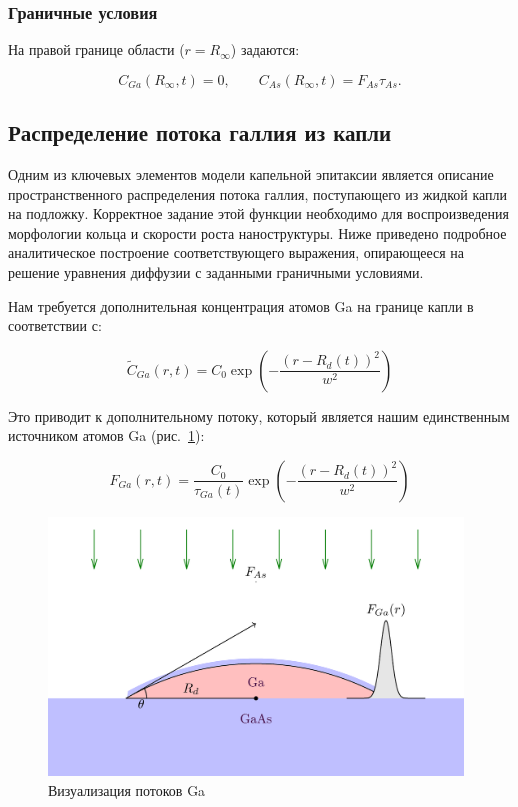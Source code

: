 \documentclass[14pt,oneside]{extarticle}
\begin{document}
\subsubsection*{Граничные условия}

На правой границе области ($r = R_\infty$) задаются:

\begin{equation}
C_{Ga}\left(R_{\infty},t\right)=0, \qquad
C_{As}\left(R_{\infty},t\right)=F_{As}\tau_{As}.
\end{equation}

\subsection{Распределение потока галлия из капли}

Одним из ключевых элементов модели капельной эпитаксии является описание пространственного распределения потока галлия, поступающего из жидкой капли на подложку. Корректное задание этой функции необходимо для воспроизведения морфологии кольца и скорости роста наноструктуры. Ниже приведено подробное аналитическое построение соответствующего выражения, опирающееся на решение уравнения диффузии с заданными граничными условиями.

Нам требуется дополнительная концентрация атомов Ga на границе капли в соответствии с:

\begin{equation}
\tilde{C}_{Ga}\left(r,t\right)=C_{0}\exp\left(-\frac{\left(r-R_{d}\left(t\right)\right)^{2}}{w^{2}}\right)
\end{equation}

Это приводит к дополнительному потоку, который является нашим единственным источником атомов Ga (рис.~\ref{fig:first}):

\begin{equation}
F_{Ga}\left(r,t\right)=\frac{C_{0}}{\tau_{Ga}\left(t\right)}\exp\left(-\frac{\left(r-R_{d}\left(t\right)\right)^{2}}{w^{2}}\right)
\end{equation}

\begin{figure}
    \begin{center}
        \includegraphics[width=11cm]{images/first.png}
        \caption{\label{fig:first}
        Визуализация потоков Ga}
    \end{center}
\end{figure}
\end{document}
